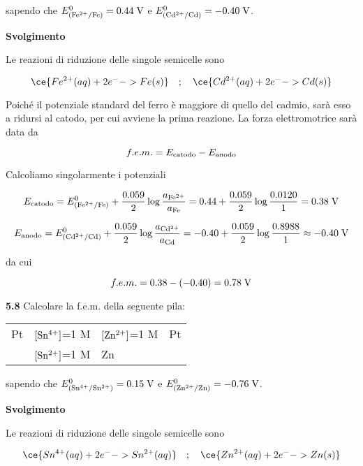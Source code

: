 sapendo che $E^0_{(\rm Fe^{2+}/Fe)}=0.44 \; \rm V$ e $E^0_{(\rm Cd^{2+}/Cd)}=-0.40 \; \rm V$.

\vspace{0.2cm}\large\textbf{Svolgimento}\normalsize

\vspace{0.2cm}Le reazioni di riduzione delle singole semicelle sono

$$\ce{Fe^{2+}(aq) + 2 e^- -> Fe(s)}
\quad;\quad
\ce{Cd^{2+}(aq) + 2 e^- -> Cd(s)}$$

Poiché il potenziale standard del ferro è maggiore di quello del cadmio, sarà esso a ridursi al catodo, per cui avviene la prima reazione. La forza elettromotrice sarà data da

$$f.e.m. = E_{\rm catodo} - E_{\rm anodo}$$

Calcoliamo singolarmente i potenziali

$$E_{\rm catodo}
=E^0_{(\rm Fe^{2+}/Fe)} + \frac{0.059}{2} \log \frac{a_{\rm Fe^{2+}}}{a_{\rm Fe}}
=0.44 + \frac{0.059}{2} \log \frac{0.0120}{1}
=0.38 \; \rm V$$

$$E_{\rm anodo} = E^0_{(\rm Cd^{2+}/Cd)} + \frac{0.059}{2} \log \frac{a_{\rm Cd^{2+}}}{a_{\rm Cd}}
=-0.40 + \frac{0.059}{2} \log \frac{0.8988}{1}
\approx -0.40 \; \rm V$$

da cui

$$f.e.m.=0.38 - (-0.40) = 0.78 \; \rm V$$

\vspace{0.2cm}\textbf{5.8} Calcolare la f.e.m. della seguente pila:

\begin{center}
    \begin{tabular}{p{0.6cm}|p{3cm}||p{3cm}|p{1cm}}
        Pt & $[\rm Sn^{4+}]$=1 M & $[\rm Zn^{2+}]$=1 M & Pt\\[0.5ex]
        & $[\rm Sn^{2+}]$=1 M & Zn &\\[0.5ex]
    \end{tabular}
\end{center}

sapendo che $E^0_{(\rm Sn^{4+}/Sn^{2+})}=0.15 \; \rm V$ e $E^0_{(\rm Zn^{2+}/Zn)}=-0.76 \; \rm V$.

\vspace{0.2cm}\large\textbf{Svolgimento}\normalsize

\vspace{0.2cm}Le reazioni di riduzione delle singole semicelle sono

$$\ce{Sn^{4+}(aq) + 2 e^- -> Sn^{2+}(aq)}
\quad;\quad
\ce{Zn^{2+}(aq) + 2 e^- -> Zn(s)}$$

